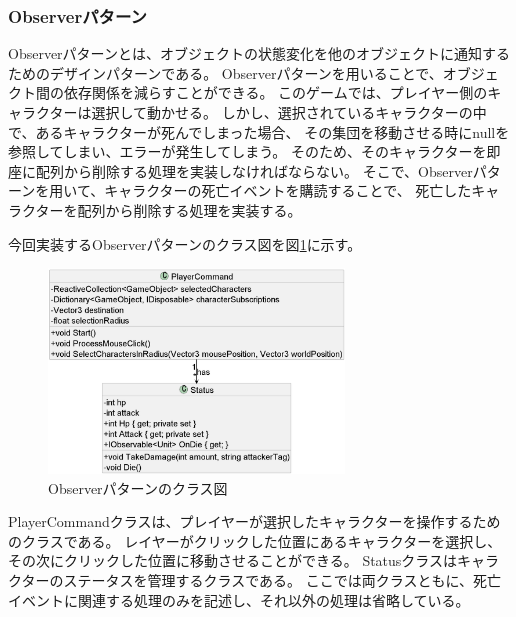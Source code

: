 \documentclass[dvipdfmx,fleqn,article]{jlreq}
\begin{document}
\subsubsection{Observerパターン}
Observerパターンとは、オブジェクトの状態変化を他のオブジェクトに通知するためのデザインパターンである。
Observerパターンを用いることで、オブジェクト間の依存関係を減らすことができる。
このゲームでは、プレイヤー側のキャラクターは選択して動かせる。
しかし、選択されているキャラクターの中で、あるキャラクターが死んでしまった場合、
その集団を移動させる時にnullを参照してしまい、エラーが発生してしまう。
そのため、そのキャラクターを即座に配列から削除する処理を実装しなければならない。
そこで、Observerパターンを用いて、キャラクターの死亡イベントを購読することで、
死亡したキャラクターを配列から削除する処理を実装する。

今回実装するObserverパターンのクラス図を図\ref{fig:ObserverClassDiagram}に示す。
\begin{figure}[H]
    \centering
    \includegraphics[width=0.7\textwidth]{figures/ObserverClassDiagram.png}
    \caption{Observerパターンのクラス図}
    \label{fig:ObserverClassDiagram}
\end{figure}

PlayerCommandクラスは、プレイヤーが選択したキャラクターを操作するためのクラスである。
レイヤーがクリックした位置にあるキャラクターを選択し、
その次にクリックした位置に移動させることができる。
Statusクラスはキャラクターのステータスを管理するクラスである。
ここでは両クラスともに、死亡イベントに関連する処理のみを記述し、それ以外の処理は省略している。
\end{document}
